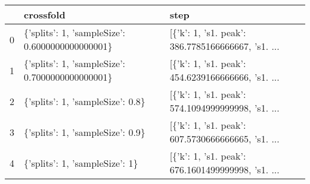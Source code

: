 \begin{tabular}{lll}
\toprule
{} &                                        crossfold &                                               step \\
\midrule
0 &  \{'splits': 1, 'sampleSize': 0.6000000000000001\} &  [\{'k': 1, 's1. peak': 386.7785166666667, 's1. ... \\
1 &  \{'splits': 1, 'sampleSize': 0.7000000000000001\} &  [\{'k': 1, 's1. peak': 454.6239166666666, 's1. ... \\
2 &                 \{'splits': 1, 'sampleSize': 0.8\} &  [\{'k': 1, 's1. peak': 574.1094999999998, 's1. ... \\
3 &                 \{'splits': 1, 'sampleSize': 0.9\} &  [\{'k': 1, 's1. peak': 607.5730666666665, 's1. ... \\
4 &                   \{'splits': 1, 'sampleSize': 1\} &  [\{'k': 1, 's1. peak': 676.1601499999998, 's1. ... \\
\bottomrule
\end{tabular}
